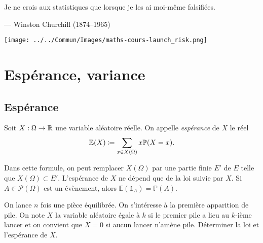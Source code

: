 \documentclass{magnolia}
\begin{document}
% 


\setlength{}
\epigraph{\og Je ne crois aux statistiques que lorsque je les ai moi-même falsifiées. \fg}{--- {\sc Winston Churchill (1874--1965)}}

\hfill\texttt{[image: ../../Commun/Images/maths-cours-launch\_risk.png]}

\magtoc




\section{Espérance, variance}

\subsection{Espérance}

\begin{definition}
Soit $X:\Omega\to\mathbb{R}$ une variable aléatoire réelle. On appelle \emph{espérance} de $X$ le
réel
\[\mathbb{E}(X)\coloneqq\sum_{x\in X(\Omega)} x \mathbb{P}(X=x).\] 
\end{definition}

\begin{remarques}
\remarque Dans cette formule, on peut remplacer $X(\Omega)$ par une partie finie $E'$ de $E$ telle que
  $X(\Omega)\subset E'$. 
\remarque L'espérance de $X$ ne dépend que de la loi suivie par $X$.
\remarque Si $A\in\mathcal{P}(\Omega)$ est un évènement, alors
  $\mathbb{E}(\mathds{1}_A)=\mathbb{P}(A).$
\end{remarques}

\begin{exoUnique}
\exo On lance $n$ fois une pièce équilibrée. On s'intéresse à la première apparition de
  pile. On note $X$ la variable aléatoire égale à $k$ si le premier pile a lieu au $k$-ième
  lancer et on convient que $X=0$ si aucun lancer n'amène pile. Déterminer la loi et
  l'espérance de $X$.
\end{exoUnique}
\end{document}
